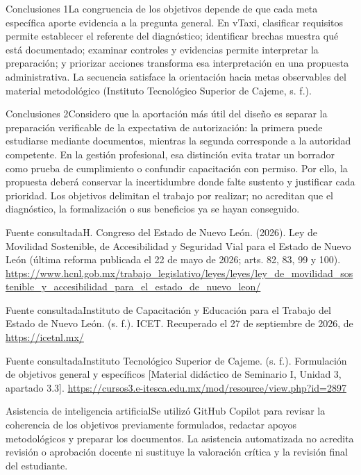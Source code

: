 \documentclass[aspectratio=169,11pt]{beamer}
\begin{document}
\begin{frame}{Conclusiones 1}\small La congruencia de los objetivos depende de que cada meta específica aporte evidencia a la pregunta general. En vTaxi, clasificar requisitos permite establecer el referente del diagnóstico; identificar brechas muestra qué está documentado; examinar controles y evidencias permite interpretar la preparación; y priorizar acciones transforma esa interpretación en una propuesta administrativa. La secuencia satisface la orientación hacia metas observables del material metodológico (Instituto Tecnológico Superior de Cajeme, s. f.).\end{frame}
\begin{frame}{Conclusiones 2}\small Considero que la aportación más útil del diseño es separar la preparación verificable de la expectativa de autorización: la primera puede estudiarse mediante documentos, mientras la segunda corresponde a la autoridad competente. En la gestión profesional, esa distinción evita tratar un borrador como prueba de cumplimiento o confundir capacitación con permiso. Por ello, la propuesta deberá conservar la incertidumbre donde falte sustento y justificar cada prioridad. Los objetivos delimitan el trabajo por realizar; no acreditan que el diagnóstico, la formalización o sus beneficios ya se hayan conseguido.\end{frame}
\begin{frame}{Fuente consultada}\small H. Congreso del Estado de Nuevo León. (2026). Ley de Movilidad Sostenible, de Accesibilidad y Seguridad Vial para el Estado de Nuevo León (última reforma publicada el 22 de mayo de 2026; arts. 82, 83, 99 y 100). \url{https://www.hcnl.gob.mx/trabajo_legislativo/leyes/leyes/ley_de_movilidad_sostenible_y_accesibilidad_para_el_estado_de_nuevo_leon/}\end{frame}
\begin{frame}{Fuente consultada}\small Instituto de Capacitación y Educación para el Trabajo del Estado de Nuevo León. (s. f.). ICET. Recuperado el 27 de septiembre de 2026, de \url{https://icetnl.mx/}\end{frame}
\begin{frame}{Fuente consultada}\small Instituto Tecnológico Superior de Cajeme. (s. f.). Formulación de objetivos general y específicos [Material didáctico de Seminario I, Unidad 3, apartado 3.3]. \url{https://cursos3.e-itesca.edu.mx/mod/resource/view.php?id=2897}\end{frame}
\begin{frame}{Asistencia de inteligencia artificial}\small Se utilizó GitHub Copilot para revisar la coherencia de los objetivos previamente formulados, redactar apoyos metodológicos y preparar los documentos. La asistencia automatizada no acredita revisión o aprobación docente ni sustituye la valoración crítica y la revisión final del estudiante.\end{frame}
\end{document}
